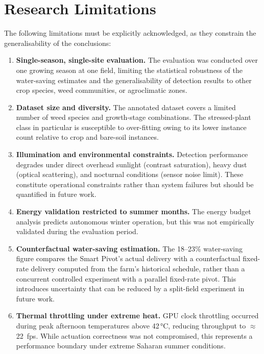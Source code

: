 \documentclass[12pt,a4paper]{report}
\begin{document}
\section{Research Limitations}
\label{sec:limitations}

The following limitations must be explicitly acknowledged, as they constrain the generalisability of the conclusions:

\begin{enumerate}[label=\textbf{L\arabic*.}]
    \item \textbf{Single-season, single-site evaluation.} The evaluation was conducted over one growing season at one field, limiting the statistical robustness of the water-saving estimates and the generalisability of detection results to other crop species, weed communities, or agroclimatic zones.

    \item \textbf{Dataset size and diversity.} The annotated dataset covers a limited number of weed species and growth-stage combinations. The stressed-plant class in particular is susceptible to over-fitting owing to its lower instance count relative to crop and bare-soil instances.

    \item \textbf{Illumination and environmental constraints.} Detection performance degrades under direct overhead sunlight (contrast saturation), heavy dust (optical scattering), and nocturnal conditions (sensor noise limit). These constitute operational constraints rather than system failures but should be quantified in future work.

    \item \textbf{Energy validation restricted to summer months.} The energy budget analysis predicts autonomous winter operation, but this was not empirically validated during the evaluation period.

    \item \textbf{Counterfactual water-saving estimation.} The 18--23\% water-saving figure compares the Smart Pivot's actual delivery with a counterfactual fixed-rate delivery computed from the farm's historical schedule, rather than a concurrent controlled experiment with a parallel fixed-rate pivot. This introduces uncertainty that can be reduced by a split-field experiment in future work.

    \item \textbf{Thermal throttling under extreme heat.} GPU clock throttling occurred during peak afternoon temperatures above 42\,°C, reducing throughput to $\approx$22~fps. While actuation correctness was not compromised, this represents a performance boundary under extreme Saharan summer conditions.


\end{enumerate}
\end{document}
